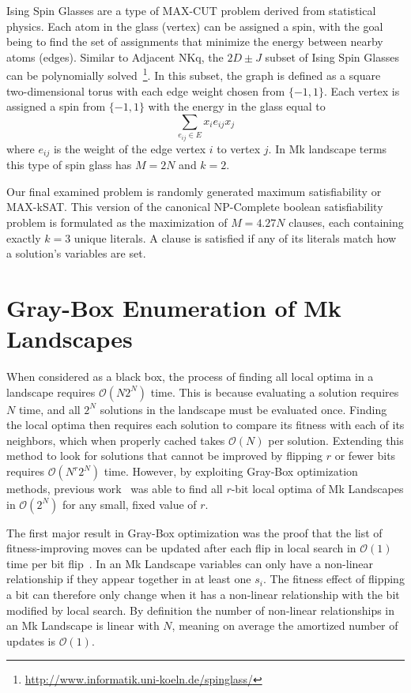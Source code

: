 \documentclass[runningheads,a4paper]{llncs}
\newcommand{\BigO}[1]{$\mathcal{O}{(#1)}$}
\begin{document}
Ising Spin Glasses are a type of MAX-CUT problem derived from statistical physics.
Each atom in the glass (vertex) can be assigned a spin, with the goal being to
find the set of assignments that minimize the energy between nearby atoms (edges).
Similar to Adjacent NKq, the $2D\pm J$ subset of Ising Spin Glasses can be polynomially
solved~\cite{saul:1994:spinglass}\footnote{\url{http://www.informatik.uni-koeln.de/spinglass/}}.
In this subset, the graph is defined as a square two-dimensional torus with each edge
weight chosen from $\{-1, 1\}$. Each vertex is assigned a spin from $\{-1, 1\}$ with
the energy in the glass equal to
\begin{equation}
\sum_{e_{ij} \in E} x_ie_{ij}x_j
  \label{eq-ising}
\end{equation}
where $e_{ij}$ is the weight of the edge vertex $i$ to vertex $j$. In Mk landscape terms
this type of spin glass has $M=2N$ and $k=2$.

Our final examined problem is randomly generated maximum satisfiability or MAX-kSAT.
This version of the canonical NP-Complete boolean satisfiability problem is formulated
as the maximization of $M=4.27N$ clauses, each containing exactly $k=3$ unique literals.
A clause is satisfied if any of its literals match how a solution's variables are set.

\section{Gray-Box Enumeration of Mk Landscapes}
When considered as a black box, the process of finding all local optima
in a landscape requires \BigO{N2^N} time. This is because evaluating
a solution requires $N$ time, and all $2^N$ solutions in the landscape
must be evaluated once. Finding the local
optima then requires each solution to compare its fitness with each
of its neighbors, which when properly cached takes \BigO{N} per solution.
Extending this method to look for solutions that cannot be improved by
flipping $r$ or fewer bits requires \BigO{N^r2^N} time. However,
by exploiting Gray-Box optimization methods, previous work~\cite{ochoa:2015:crossovernetworks}
was able to find all $r$-bit local optima of Mk Landscapes in \BigO{2^N} for any small,
fixed value of $r$.

The first major result in Gray-Box optimization was the proof that the list
of fitness-improving moves can be updated after each flip in local search in \BigO{1}
time per bit flip~\cite{whitley:2012:constant}. In an Mk Landscape variables
can only have a non-linear relationship if they appear together in at least one $s_i$.
The fitness effect of flipping a bit can therefore only change when it has a non-linear
relationship with the bit modified by local search. By definition the number of non-linear
relationships in an Mk Landscape is linear with $N$, meaning on average the amortized
number of updates is \BigO{1}.
\end{document}
